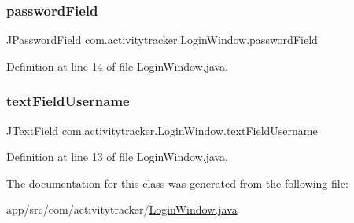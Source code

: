 \subsubsection{\texorpdfstring{password\+Field}{passwordField}}
{\footnotesize\ttfamily J\+Password\+Field com.\+activitytracker.\+Login\+Window.\+password\+Field\hspace{0.3cm}{\ttfamily [private]}}



Definition at line 14 of file Login\+Window.\+java.

\mbox{\label{classcom_1_1activitytracker_1_1_login_window_aba181dcec114c349a67304406bcce92a}} 
\subsubsection{\texorpdfstring{text\+Field\+Username}{textFieldUsername}}
{\footnotesize\ttfamily J\+Text\+Field com.\+activitytracker.\+Login\+Window.\+text\+Field\+Username\hspace{0.3cm}{\ttfamily [private]}}



Definition at line 13 of file Login\+Window.\+java.



The documentation for this class was generated from the following file\+:\begin{DoxyCompactItemize}
\item 
app/src/com/activitytracker/\mbox{\hyperlink{_login_window_8java}{Login\+Window.\+java}}\end{DoxyCompactItemize}
